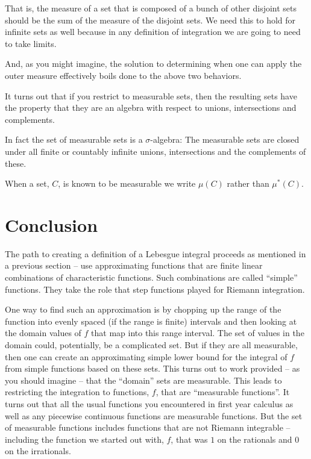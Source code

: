 \documentclass{article}
\begin{document}
That is, the measure of a set that is composed of a bunch of other disjoint 
sets should be the sum of the measure of the disjoint sets. We need this to hold
for infinite sets as well because in any definition of integration we are going 
to need to take limits.

And, as you might imagine, the solution to determining when one can apply the 
outer measure effectively boils done to the above two behaviors.

It turns out that if you restrict to measurable sets, 
then the resulting sets have the property that they are an 
algebra with respect to unions, intersections and complements. 

In fact the set of measurable sets is a $\sigma$-algebra:
The measurable sets are closed under all finite or countably infinite unions, intersections and the complements of these.

When a set, $C$, is known to be measurable we write $\mu(C)$ rather than $\mu^*(C)$.

\section{Conclusion}

The path to creating a definition of a Lebesgue integral proceeds as mentioned 
in a previous section -- use approximating functions that are finite linear
combinations of characteristic functions. Such combinations are called ``simple''
functions. They take the role that step functions played for Riemann integration. 

One way to find such an approximation is by chopping up the range of the function 
into evenly spaced (if the range is finite) intervals and then looking at the 
domain values of $f$ that map into this range interval. The set of values in 
the domain could, potentially, be a complicated set. But if they are all measurable, then 
one can create an approximating simple lower bound for the integral of $f$ 
from simple functions based on these sets. This turns out to work provided -- 
as you should imagine -- that the ``domain'' sets are measurable. This leads to 
restricting the integration to functions, $f$, that are ``measurable functions''. 
It turns out that all the usual functions you encountered in first year 
calculus as well as any piecewise continuous functions are measurable functions. 
But the set of measurable functions includes functions that are
not Riemann integrable -- including the function we started out with, $f$, that
was $1$ on the rationals and $0$ on the irrationals.
\end{document}

